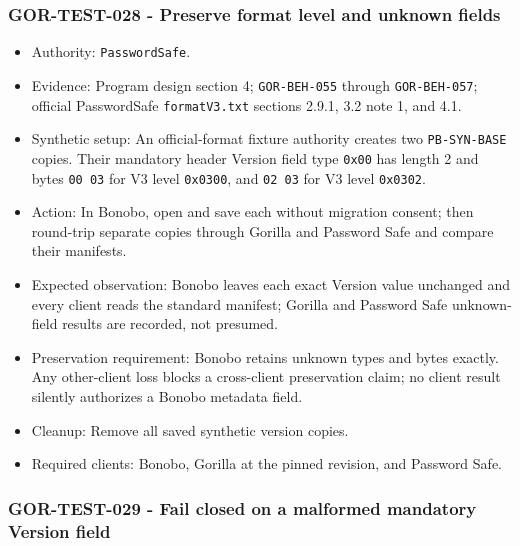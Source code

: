 \documentclass[
  letterpaper,
]{article}
\newcommand{\passthrough}[1]{#1}
\providecommand{\tightlist}{%
  \setlength{\itemsep}{0pt}\setlength{\parskip}{0pt}}
\begin{document}
\subsubsection{GOR-TEST-028 - Preserve format level and unknown
fields}\label{gor-test-028---preserve-format-level-and-unknown-fields}

\begin{itemize}
\tightlist
\item
  Authority: \nolinkurl{PasswordSafe}.
\item
  Evidence: Program design section 4; \nolinkurl{GOR-BEH-055} through \nolinkurl{GOR-BEH-057}; official PasswordSafe
  \nolinkurl{formatV3.txt} sections 2.9.1, 3.2 note 1, and 4.1.
\item
  Synthetic setup: An official-format fixture authority creates two \nolinkurl{PB-SYN-BASE} copies. Their mandatory
  header Version field type \passthrough{\lstinline!0x00!} has length 2 and bytes \passthrough{\lstinline!00 03!} for V3
  level \passthrough{\lstinline!0x0300!}, and \passthrough{\lstinline!02 03!} for V3 level
  \passthrough{\lstinline!0x0302!}.
\item
  Action: In Bonobo, open and save each without migration consent; then round-trip separate copies through Gorilla and
  Password Safe and compare their manifests.
\item
  Expected observation: Bonobo leaves each exact Version value unchanged and every client reads the standard manifest;
  Gorilla and Password Safe unknown-field results are recorded, not presumed.
\item
  Preservation requirement: Bonobo retains unknown types and bytes exactly. Any other-client loss blocks a cross-client
  preservation claim; no client result silently authorizes a Bonobo metadata field.
\item
  Cleanup: Remove all saved synthetic version copies.
\item
  Required clients: Bonobo, Gorilla at the pinned revision, and Password Safe.
\end{itemize}

\subsubsection{GOR-TEST-029 - Fail closed on a malformed mandatory Version
field}\label{gor-test-029---fail-closed-on-a-malformed-mandatory-version-field}
\end{document}
